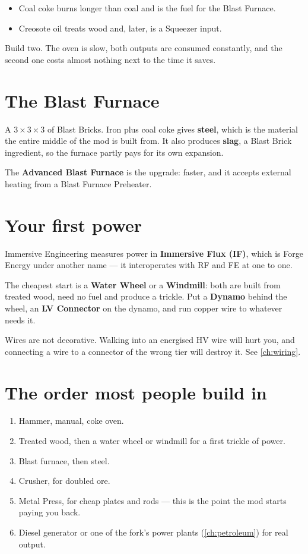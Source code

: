 \begin{itemize}
\item Coal coke burns longer than coal and is the fuel for the Blast Furnace.
\item Creosote oil treats wood and, later, is a Squeezer input.
\end{itemize}

\begin{ietip}
Build two. The oven is slow, both outputs are consumed constantly, and the second one costs almost
nothing next to the time it saves.
\end{ietip}

\section{The Blast Furnace}

A $3\times3\times3$ of Blast Bricks. Iron plus coal coke gives \textbf{steel}, which is the material
the entire middle of the mod is built from. It also produces \textbf{slag}, a Blast Brick
ingredient, so the furnace partly pays for its own expansion.

The \textbf{Advanced Blast Furnace} is the upgrade: faster, and it accepts external heating from a
Blast Furnace Preheater.

\section{Your first power}

Immersive Engineering measures power in \textbf{Immersive Flux (IF)}, which is Forge Energy under
another name --- it interoperates with RF and FE at one to one.

The cheapest start is a \textbf{Water Wheel} or a \textbf{Windmill}: both are built from treated
wood, need no fuel and produce a trickle. Put a \textbf{Dynamo} behind the wheel, an \textbf{LV
Connector} on the dynamo, and run copper wire to whatever needs it.

\begin{iewarning}
Wires are not decorative. Walking into an energised HV wire will hurt you, and connecting a wire to
a connector of the wrong tier will destroy it. See \autoref{ch:wiring}.
\end{iewarning}

\section{The order most people build in}

\begin{enumerate}
\item Hammer, manual, coke oven.
\item Treated wood, then a water wheel or windmill for a first trickle of power.
\item Blast furnace, then steel.
\item Crusher, for doubled ore.
\item Metal Press, for cheap plates and rods --- this is the point the mod starts paying you back.
\item Diesel generator or one of the fork's power plants (\autoref{ch:petroleum}) for real output.
\end{enumerate}
